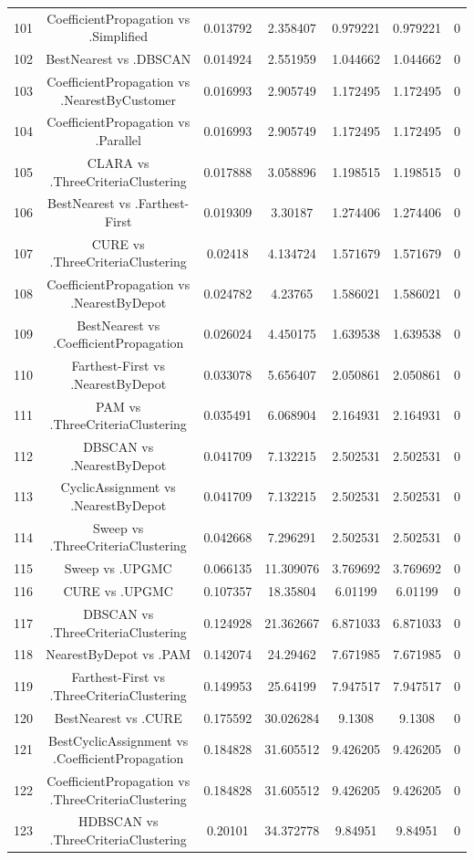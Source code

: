 \documentclass[a4paper,10pt]{article}
\begin{document}
\begin{landscape}
\begin{table}[!htp]
\begin{tabular}{ccccccc}
101&CoefficientPropagation vs .Simplified&0.013792&2.358407&0.979221&0.979221&0\\
102&BestNearest vs .DBSCAN&0.014924&2.551959&1.044662&1.044662&0\\
103&CoefficientPropagation vs .NearestByCustomer&0.016993&2.905749&1.172495&1.172495&0\\
104&CoefficientPropagation vs .Parallel&0.016993&2.905749&1.172495&1.172495&0\\
105&CLARA vs .ThreeCriteriaClustering&0.017888&3.058896&1.198515&1.198515&0\\
106&BestNearest vs .Farthest-First&0.019309&3.30187&1.274406&1.274406&0\\
107&CURE vs .ThreeCriteriaClustering&0.02418&4.134724&1.571679&1.571679&0\\
108&CoefficientPropagation vs .NearestByDepot&0.024782&4.23765&1.586021&1.586021&0\\
109&BestNearest vs .CoefficientPropagation&0.026024&4.450175&1.639538&1.639538&0\\
110&Farthest-First vs .NearestByDepot&0.033078&5.656407&2.050861&2.050861&0\\
111&PAM vs .ThreeCriteriaClustering&0.035491&6.068904&2.164931&2.164931&0\\
112&DBSCAN vs .NearestByDepot&0.041709&7.132215&2.502531&2.502531&0\\
113&CyclicAssignment vs .NearestByDepot&0.041709&7.132215&2.502531&2.502531&0\\
114&Sweep vs .ThreeCriteriaClustering&0.042668&7.296291&2.502531&2.502531&0\\
115&Sweep vs .UPGMC&0.066135&11.309076&3.769692&3.769692&0\\
116&CURE vs .UPGMC&0.107357&18.35804&6.01199&6.01199&0\\
117&DBSCAN vs .ThreeCriteriaClustering&0.124928&21.362667&6.871033&6.871033&0\\
118&NearestByDepot vs .PAM&0.142074&24.29462&7.671985&7.671985&0\\
119&Farthest-First vs .ThreeCriteriaClustering&0.149953&25.64199&7.947517&7.947517&0\\
120&BestNearest vs .CURE&0.175592&30.026284&9.1308&9.1308&0\\
121&BestCyclicAssignment vs .CoefficientPropagation&0.184828&31.605512&9.426205&9.426205&0\\
122&CoefficientPropagation vs .ThreeCriteriaClustering&0.184828&31.605512&9.426205&9.426205&0\\
123&HDBSCAN vs .ThreeCriteriaClustering&0.20101&34.372778&9.84951&9.84951&0\\

\end{tabular}
\end{table}
\end{landscape}
\end{document}
